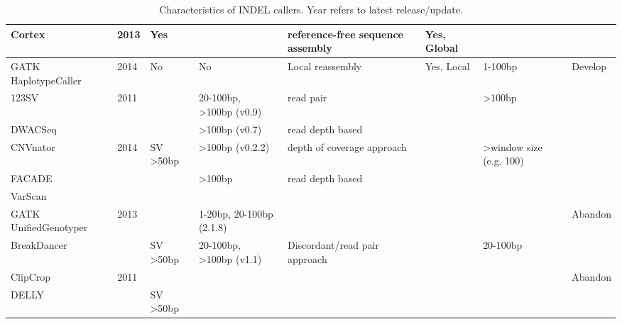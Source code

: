 \begin{table}[h]
{\begin{tabular}{|l|l|l|l|l|l|l|l|}
Cortex\cite{Iqbal2012Cortex} & 2013 & Yes &  & reference-free sequence assembly & Yes, Global &  \\ \hline
GATK HaplotypeCaller & 2014 & No & No & Local reassembly & Yes, Local & 1-100bp & Develop \\ \hline
123SV & 2011 & & 20-100bp, \textgreater100bp (v0.9) & read pair &  & \textgreater100bp \\ \hline
DWACSeq & & & \textgreater100bp (v0.7) & read depth based &  & \\ \hline
CNVnator & 2014 & SV \textgreater50bp & \textgreater100bp (v0.2.2) & depth of coverage approach &  & \textgreater window size (e.g. 100) \\ \hline
FACADE & &  & \textgreater100bp & read depth based &  & \\ \hline
VarScan\cite{Koboldt01032012} & &  &  &  &  &  \\ \hline
GATK UnifiedGenotyper & 2013 &  & 1-20bp, 20-100bp (2.1.8) &  &  & & Abandon  \\ \hline
BreakDancer & & SV \textgreater50bp & 20-100bp, \textgreater100bp (v1.1) & Discordant/read pair approach &  & 20-100bp \\ \hline
ClipCrop & 2011 & &  &  &  & & Abandon \\ \hline
DELLY & & SV \textgreater50bp &  &  &  & & \\ \hline
\end{tabular}
}
\caption{Characteristics of INDEL callers. Year refers to latest release/update.}
\label{INDELcallers}
\end{table}